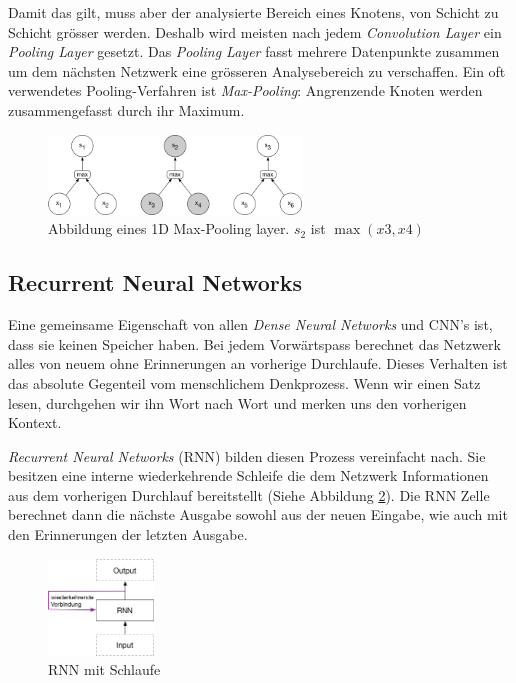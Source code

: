 Damit das gilt, muss aber der analysierte Bereich eines Knotens, von Schicht zu Schicht grösser werden. Deshalb wird meisten nach jedem \textit{Convolution Layer} ein \textit{Pooling Layer} gesetzt. Das \textit{Pooling Layer} fasst mehrere Datenpunkte zusammen um dem nächsten Netzwerk eine grösseren Analysebereich zu verschaffen. Ein oft verwendetes Pooling-Verfahren ist \textit{Max-Pooling}: Angrenzende Knoten werden zusammengefasst durch ihr Maximum. 
\begin{figure}[hbt]
	\centering
		\includegraphics[width=0.6\textwidth]{assets/pooling_1d.png}
	\caption{Abbildung eines 1D Max-Pooling layer. $s_2$ ist $\max (x3, x4)$}
	\label{img:pool}
\end{figure}


\subsection{Recurrent Neural Networks}
Eine gemeinsame Eigenschaft von allen \textit{Dense Neural Networks} und CNN's ist, dass sie keinen Speicher haben. Bei jedem Vorwärtspass berechnet das Netzwerk alles von neuem ohne Erinnerungen an vorherige Durchlaufe. Dieses Verhalten ist das absolute Gegenteil vom menschlichem Denkprozess. Wenn wir einen Satz lesen, durchgehen wir ihn Wort nach Wort und merken uns den vorherigen Kontext.

\textit{Recurrent Neural Networks} (RNN) bilden diesen Prozess vereinfacht nach. Sie besitzen eine interne wiederkehrende Schleife die dem Netzwerk Informationen aus dem vorherigen Durchlauf bereitstellt (Siehe Abbildung \ref{img:rnn_loop}). Die RNN Zelle berechnet dann die nächste Ausgabe sowohl aus der neuen Eingabe, wie auch mit den Erinnerungen der letzten Ausgabe. \parencite{chollet}\\
\begin{figure}[hbt]
	\centering
		\includegraphics[width=0.25\textwidth]{assets/rnn_loop.png}
	\caption{RNN mit Schlaufe}
	\label{img:rnn_loop}
\end{figure}

